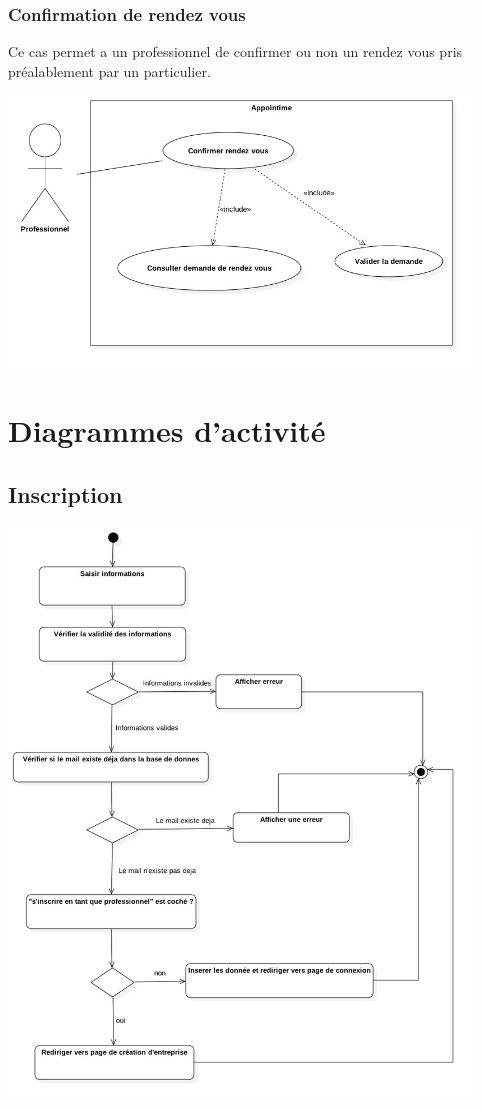 \documentclass{article}
\begin{document}
\subsubsection{Confirmation de rendez vous}
Ce cas permet a un professionnel de confirmer ou non un rendez vous pris préalablement par un particulier.
\begin{center}
  \includegraphics[width=350pt]{diagram/useCaseConfirmerDemande}
\end{center}
\section{Diagrammes d'activité}
\subsection{Inscription}
\begin{center}
  \includegraphics[width=350pt]{diagram/activiteInscription}
\end{center}
\end{document}
